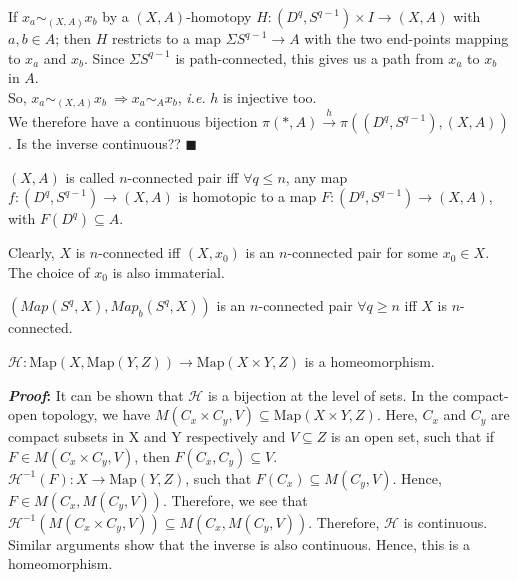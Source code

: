 \documentclass[11pt]{article}
\numberwithin{equation}{section}
\begin{document}
If $x_a\sim_{(X,A)}x_b$ by a $(X,A)$-homotopy $H:(D^q,S^{q-1})\times I\rightarrow (X,A)$ with $a,b\in A$; then $H$ restricts to a map $\Sigma S^{q-1}\rightarrow A$ with the two end-points mapping to $x_a$ and $x_b$. Since $\Sigma S^{q-1}$ is path-connected, this gives us a path from $x_a$ to $x_b$ in $A$. \\ So, $x_a\sim_{(X,A)}x_b\ \Rightarrow x_a\sim_{A}x_b$, \emph{i.e.} $h$ is injective too. \\ 
We therefore have a continuous bijection $\pi(*,A)\xrightarrow{h}\pi((D^q,S^{q-1}),(X,A))$. Is the inverse continuous?? $\blacksquare$
\begin{defn}
     $(X,A)$ is called $n$-connected pair iff $\forall q\leqslant n$, any map $f:(D^q,S^{q-1})\rightarrow (X,A)$ is homotopic to a map $F:(D^q,S^{q-1})\rightarrow (X,A)$, with $F(D^q)\subseteq A$. 
\end{defn}
\begin{rem}
     Clearly, $X$ is $n$-connected iff $(X,x_0)$ is an $n$-connected pair for some $x_0\in X$. The choice of $x_0$ is also immaterial.
\end{rem}
\begin{rem}
     $(Map(S^q,X),Map_b(S^q,X))$ is an $n$-connected pair $\forall q\geqslant n$ iff $X$ is $n$-connected.
\end{rem}

\begin{clm}
	$\mathcal{H}:\text{Map}(X,\text{Map}(Y,Z))\rightarrow\text{Map}(X\times Y,Z)$ is a homeomorphism.
\end{clm}
\textbf{\emph{Proof}:} It can be shown that $\mathcal{H}$ is a bijection at the level of sets.
In the compact-open topology, we have $M(C_x\times C_y,V)\subseteq\text{Map}(X\times Y,Z)$. Here, $C_x$ and $C_y$ are compact subsets in X and Y respectively and $V\subseteq Z$ is an open set, such that if $F\in M(C_x\times C_y, V)$, then $F(C_x,C_y)\subseteq V$.\\[10pt]
$\mathcal{H}^{-1}(F):X\to\text{Map}(Y,Z)$, such that $F(C_x)\subseteq M(C_y,V)$. Hence, $F\in M(C_x, M(C_y, V))$. Therefore, we see that $\mathcal{H}^{-1}(M(C_x\times C_y, V))\subseteq M(C_x,M(C_y,V))$. Therefore, $\mathcal{H}$ is continuous. Similar arguments show that the inverse is also continuous. Hence, this is a homeomorphism.
\end{document}
